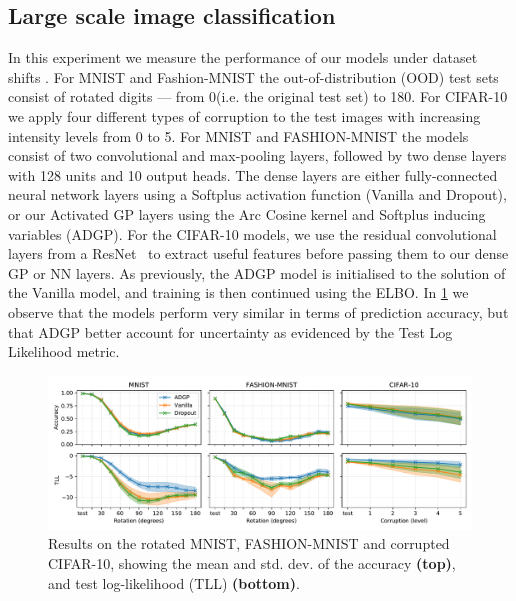 \subsection{Large scale image classification}
In this experiment we measure the performance of our models under dataset shifts \citep{Ovadia2019}. For MNIST and Fashion-MNIST the out-of-distribution (OOD) test sets consist of rotated digits --- from 0\textdegree (i.e. the original test set) to 180\textdegree. For CIFAR-10 we apply four different types of corruption to the test images with increasing intensity levels from 0 to 5. For MNIST and FASHION-MNIST the models consist of two convolutional and max-pooling layers, followed by two dense layers with 128 units and 10 output heads. The dense layers are either fully-connected neural network layers using a Softplus activation function (Vanilla and Dropout), or our Activated GP layers using the Arc Cosine kernel and Softplus inducing variables (ADGP). For the CIFAR-10 models, we use the residual convolutional layers from a ResNet~\citep{he2016deep} to extract useful features before passing them to our dense GP or NN layers. As previously, the ADGP model is initialised to the solution of the Vanilla model, and training is then continued using the ELBO. In \cref{fig:image-classification} we observe that the models perform very similar in terms of prediction accuracy, but that ADGP better account for uncertainty as evidenced by the Test Log Likelihood metric.%

\begin{figure}[t]
    \centering   
    \includegraphics[width=\textwidth]{image_classification}
    \caption{Results on the rotated MNIST, FASHION-MNIST and corrupted CIFAR-10, showing the mean and std. dev. of the accuracy \textbf{(top)}, and test log-likelihood (TLL) \textbf{(bottom)}.}
    \label{fig:image-classification}
\end{figure}


